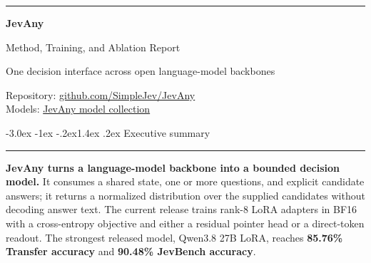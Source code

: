 \documentclass[10pt]{article}
\makeatletter
\renewcommand\section{\@startsection{section}{1}{\z@}%
  {-3.0ex \@plus -1ex \@minus -.2ex}{1.4ex \@plus .2ex}%
  {\color{navy}\Large\bfseries}}
\newenvironment{summarybox}{%
  \par\medskip\noindent\begin{center}\begin{minipage}{.94\linewidth}%
  \color{ink}\textcolor{blue}{\rule{3pt}{\baselineskip}}\hspace{7pt}%
}{\end{minipage}\end{center}\medskip}
\makeatother
\begin{document}
\begin{titlepage}
\pagecolor{navy}\color{white}

\vspace*{1.30in}
{\color{cyan}\rule{\textwidth}{5pt}\par}\vspace{0.32in}
{\color{white}\fontsize{36}{39}\selectfont\bfseries JevAny\par}
\vspace{0.16in}
{\color{white}\fontsize{21}{25}\selectfont Method, Training, and Ablation Report\par}
\vspace{0.22in}
{\color{cyan!35}\large One decision interface across open language-model backbones\par}

\vfill
\noindent{}\par
\vspace{0.22in}
{\color{white!68}\small
Repository: \href{https://github.com/SimpleJev/JevAny}{github.com/SimpleJev/JevAny}\\
Models: \href{https://huggingface.co/collections/SimpleJev/jevany-adaptive-decision-systems-6abc8fd39266b1c17b11b4e6}{JevAny model collection}\par}
\end{titlepage}
\nopagecolor\color{ink}

\tableofcontents
\clearpage

\section{Executive summary}

\begin{summarybox}
\textbf{JevAny turns a language-model backbone into a bounded decision model.}
It consumes a shared state, one or more questions, and explicit candidate answers;
it returns a normalized distribution over the supplied candidates without decoding
answer text. The current release trains rank-8 LoRA adapters in BF16 with a
cross-entropy objective and either a residual pointer head or a direct-token
readout. The strongest released model, Qwen3.8 27B LoRA, reaches
\textbf{85.76\% Transfer accuracy} and \textbf{90.48\% JevBench accuracy}.
\end{summarybox}
\end{document}
